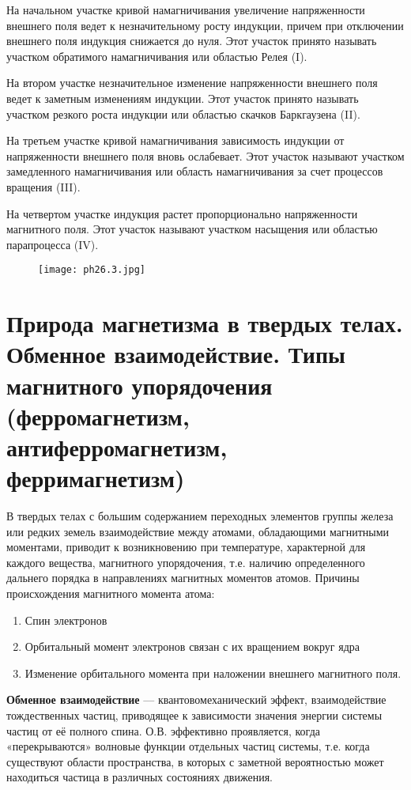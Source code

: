 На начальном участке кривой намагничивания увеличение напряженности внешнего поля ведет к незначительному росту индукции, причем при отключении внешнего поля индукция снижается до нуля. Этот участок принято называть участком обратимого намагничивания или областью Релея (I).

На втором участке незначительное изменение напряженности внешнего поля ведет к заметным изменениям индукции. Этот участок принято называть участком резкого роста индукции или областью скачков Баркгаузена (II).

На третьем участке кривой намагничивания зависимость индукции от напряженности внешнего поля вновь ослабевает. Этот участок называют участком замедленного намагничивания или область намагничивания за счет процессов вращения (III).

На четвертом участке индукция растет пропорционально напряженности магнитного поля. Этот участок называют участком насыщения или областью парапроцесса (IV).
\begin{figure}[h!]
    \centering
    \texttt{[image: ph26.3.jpg]}
\end{figure}






\section{Природа магнетизма в твердых телах. Обменное взаимодействие. Типы магнитного упорядочения (ферромагнетизм, антиферромагнетизм, ферримагнетизм)}
В твердых телах с большим содержанием переходных элементов группы железа
или редких земель взаимодействие между атомами, обладающими магнитными
моментами, приводит к возникновению при температуре, характерной для каждого
вещества, магнитного упорядочения, т.е. наличию определенного дальнего порядка
в направлениях магнитных моментов атомов.
Причины происхождения магнитного момента атома:


\begin{enumerate}
    \item Спин электронов
    \item Орбитальный момент электронов связан с их вращением вокруг ядра
    \item Изменение орбитального момента при наложении внешнего магнитного поля.
\end{enumerate}


\textbf{ Обменное взаимодействие} --– квантовомеханический эффект, взаимодействие тождественных частиц, приводящее к зависимости значения энергии системы частиц от её полного спина. О.В. эффективно проявляется, когда «перекрываются» волновые функции отдельных частиц системы, т.е. когда существуют области пространства, в которых с заметной вероятностью может находиться частица в различных состояниях движения. 


